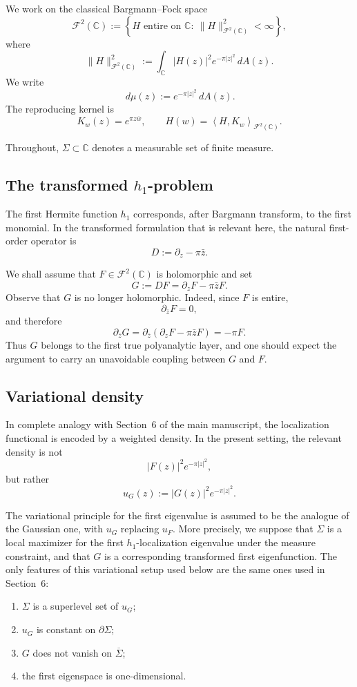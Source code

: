 \documentclass[11pt]{article}
\newcommand{\C}{\mathbb C}
\newcommand{\F}{\mathcal F^2(\C)}
\newcommand{\dA}{\,dA}
\newcommand{\dmu}{\,d\mu}
\newcommand{\pw}{\partial_z}
\newcommand{\pwb}{\partial_{\bar z}}
\newcommand{\1}{\mathbf 1}
\newcommand{\inner}[2]{\left\langle #1,#2\right\rangle}
\newcommand{\abs}[1]{\left|#1\right|}
\newcommand{\set}[1]{\left\{#1\right\}}
\begin{document}
We work on the classical Bargmann--Fock space
\[
\F
:=
\set{H\text{ entire on }\C:\ \|H\|_{\F}^2<\infty},
\]
where
\[
\|H\|_{\F}^2
:=
\int_\C \abs{H(z)}^2 e^{-\pi\abs{z}^2}\dA(z).
\]
We write
\[
\dmu(z):=e^{-\pi\abs{z}^2}\dA(z).
\]
The reproducing kernel is
\[
K_w(z)=e^{\pi z\overline w},
\qquad
H(w)=\inner{H}{K_w}_{\F}.
\]

Throughout, \(\Sigma\subset \C\) denotes a measurable set of finite measure.

\subsection{The transformed \(h_1\)-problem}

The first Hermite function \(h_1\) corresponds, after Bargmann transform, to the
first monomial. In the transformed formulation that is relevant here, the natural
first-order operator is
\[
D:=\pw-\pi\bar z.
\]

We shall assume that \(F\in \F\) is holomorphic and set
\begin{equation}\label{eq:def-G}
G:=DF=\pw F-\pi\bar z F.
\end{equation}
Observe that \(G\) is no longer holomorphic. Indeed, since \(F\) is entire,
\[
\pwb F=0,
\]
and therefore
\begin{equation}\label{eq:dbar-G}
\pwb G
=
\pwb(\pw F-\pi\bar z F)
=
-\pi F.
\end{equation}
Thus \(G\) belongs to the first true polyanalytic layer, and one should expect
the argument to carry an unavoidable coupling between \(G\) and \(F\).

\subsection{Variational density}

In complete analogy with Section~6 of the main manuscript, the localization
functional is encoded by a weighted density. In the present setting, the relevant
density is not
\[
\abs{F(z)}^2 e^{-\pi\abs{z}^2},
\]
but rather
\begin{equation}\label{eq:uG}
u_G(z):=\abs{G(z)}^2 e^{-\pi\abs{z}^2}.
\end{equation}

The variational principle for the first eigenvalue is assumed to be the analogue of
the Gaussian one, with \(u_G\) replacing \(u_F\). More precisely, we suppose that
\(\Sigma\) is a local maximizer for the first \(h_1\)-localization eigenvalue under
the measure constraint, and that \(G\) is a corresponding transformed first
eigenfunction. The only features of this variational setup used below are the same
ones used in Section~6:
\begin{enumerate}[label=\textnormal{(\arabic*)}]
\item \(\Sigma\) is a superlevel set of \(u_G\);
\item \(u_G\) is constant on \(\partial\Sigma\);
\item \(G\) does not vanish on \(\overline\Sigma\);
\item the first eigenspace is one-dimensional.
\end{enumerate}
\end{document}

